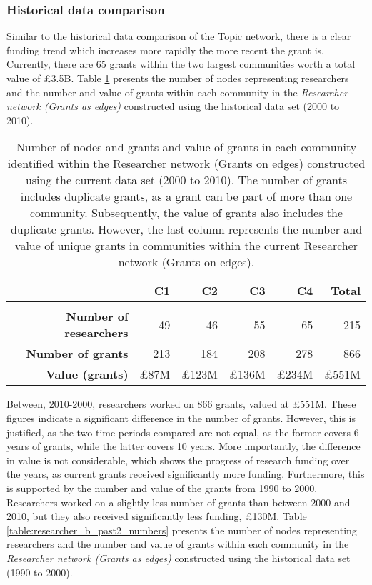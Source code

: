 {\subsubsection{Historical data comparison}

Similar to the historical data comparison of the Topic network, there is a clear funding trend which increases more rapidly the more recent the grant is. Currently, there are 65 grants within the two largest communities worth a total value of \pounds3.5B. Table \ref{table:researcher_b_past1_numbers} presents the number of nodes representing researchers and the number and value of grants within each community in the \textit{Researcher network (Grants as edges)} constructed using the historical data set (2000 to 2010).

\begin{table}[!htbp]
\centering
\caption[Number of nodes and grants and value of grants in each community within the Researcher network (Grants as edges) constructed using the current data set (2000 to 2010).]{Number of nodes and grants and value of grants in each community identified within the Researcher network (Grants on edges) constructed using the current data set (2000 to 2010). The number of grants includes duplicate grants, as a grant can be part of more than one community. Subsequently, the value of grants also includes the duplicate grants. However, the last column represents the number and value of unique grants in communities within the current Researcher network (Grants on edges).}
\label{table:researcher_b_past1_numbers}
\begin{tabular}{r|rrrrr}
{} & \textbf{C1} & \textbf{C2} & \textbf{C3} & \textbf{C4} & \textbf{Total}\\
\hline\\
\textbf{Number of researchers} & {49}  & {46}  & {55}  & {65}  & {215}\\
\textbf{Number of grants}      & {213} & {184} & {208} & {278} & {866}\\
\textbf{Value (grants)} & {\pounds87M} & {\pounds123M} & {\pounds136M} & {\pounds234M} & {\pounds551M}\\
\end{tabular}
\end{table}

Between, 2010-2000, researchers worked on 866 grants, valued at \pounds551M. These figures indicate a significant difference in the number of grants. However, this is justified, as the two time periods compared are not equal, as the former covers 6 years of grants, while the latter covers 10 years. More importantly, the difference in value is not considerable, which shows the progress of research funding over the years, as current grants received significantly more funding. Furthermore, this is supported by the number and value of the grants from 1990 to 2000.  Researchers worked on a slightly less number of grants than between 2000 and 2010, but they also received significantly less funding, \pounds130M. Table \ref{table:researcher_b_past2_numbers} presents the number of nodes representing researchers and the number and value of grants within each community in the \textit{Researcher network (Grants as edges)} constructed using the historical data set (1990 to 2000).

}
